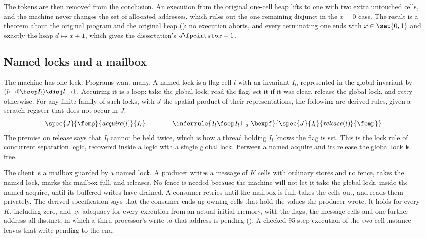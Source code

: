 The tokens are then removed from the conclusion. An execution from the
original one-cell heap lifts to one with two extra untouched cells, and the
machine never changes the set of allocated addresses, which rules out the
one remaining disjunct in the $x = 0$ case. The result is a theorem about
the original program and the original heap
(): no execution aborts, and every
terminating one ends with $x \in \set{0,1}$ and exactly the heap
$d \mapsto x + 1$, which gives the dissertation's
$d \fpointsto x + 1$.

\subsection{Named locks and a mailbox}

The machine has one lock. Programs want many. A named lock is a flag cell
$l$ with an invariant $I_l$, represented in the global invariant by
$(l \fcell 0 \fsep I_l) \disj l \fcell 1$. Acquiring it is a loop: take the
global lock, read the flag, set it if it was clear, release the global
lock, and retry otherwise. For any finite family of such locks, with $J$
the spatial product of their representations, the following are derived
rules, given a scratch register that does not occur in $J$:
\[
  \spec{J}{\femp}{\mathit{acquire}(l)}{I_l}
  \qquad\qquad
  \inferrule{I_l \fsep I_l \vdash_a \bexpf}
            {\spec{J}{I_l}{\mathit{release}(l)}{\femp}}
\]
The premise on release says that $I_l$ cannot be held twice, which is how a
thread holding $I_l$ knows the flag is set. This is the lock rule of
concurrent separation logic, recovered inside a logic with a single global
lock. Between a named acquire and its release the global lock is free.

The client is a mailbox guarded by a named lock. A producer writes a
message of $K$ cells with ordinary stores and no fence, takes the named
lock, marks the mailbox full, and releases. No fence is needed because the
machine will not let it take the global lock, inside the named acquire,
until its buffered writes have drained. A consumer retries until the mailbox
is full, takes the cells out, and reads them privately. The derived
specification says that the consumer ends up owning cells that hold the
values the producer wrote. It holds for every $K$, including zero, and by adequacy for every execution from
an actual initial memory, with the flags, the message cells and one further
address all distinct, in which a third processor's write to that address is
pending (). A checked 95-step execution of the two-cell
instance leaves that write pending to the end.
